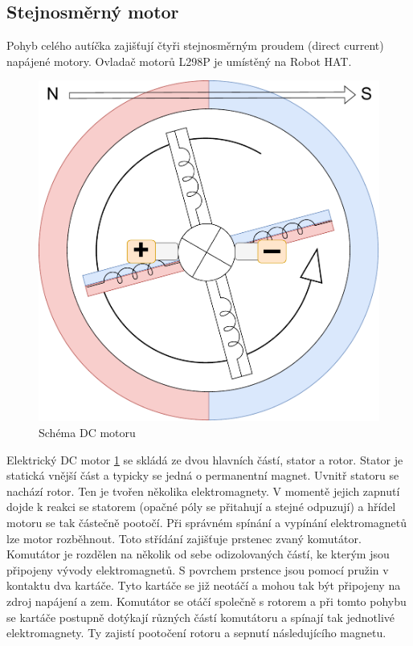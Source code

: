 \subsection*{Stejnosměrný motor}
Pohyb celého autíčka zajišťují čtyři stejnosměrným proudem (direct current) napájené motory. Ovladač motorů L298P je umístěný na Robot HAT.

\begin{figure}[h!]
	\centering
	\includegraphics[scale=0.5]{obrazky-figures/dc_motor.pdf}
	\caption{Schéma DC motoru}
	\label{fig:dc_motor}
\end{figure}

Elektrický DC motor \ref{fig:dc_motor} se skládá ze dvou hlavních částí, stator a rotor. Stator je statická vnější část a typicky se jedná o permanentní magnet. Uvnitř statoru se nachází rotor. Ten je tvořen několika elektromagnety. V momentě jejich zapnutí dojde k reakci se statorem (opačné póly se přitahují a stejné odpuzují) a hřídel motoru se tak částečně pootočí. Při správném spínání a vypínání elektromagnetů lze motor rozběhnout.
Toto střídání zajišťuje prstenec zvaný komutátor. Komutátor je rozdělen na několik od sebe odizolovaných částí, ke kterým jsou připojeny vývody elektromagnetů. S povrchem prstence jsou pomocí pružin v kontaktu dva kartáče. Tyto kartáče se již neotáčí a mohou tak být připojeny na zdroj napájení a zem. Komutátor se otáčí společně s rotorem a při tomto pohybu se kartáče postupně dotýkají různých částí komutátoru a spínají tak jednotlivé elektromagnety. Ty zajistí pootočení rotoru a sepnutí následujícího magnetu. \cite[std:~28-36]{mobilní_roboty}

